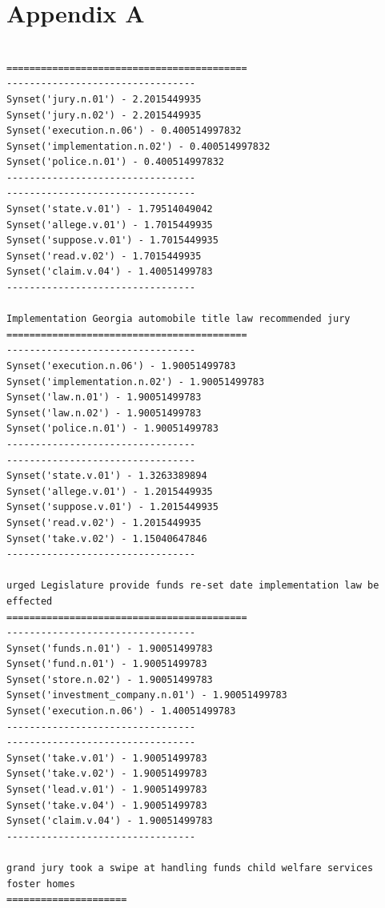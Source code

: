 \documentclass[]{article}
\begin{document}
\section*{Appendix A}
\label{sec:AppA}
\begin{lstlisting}[caption={A trace of the STM throughout runtime}, captionpos=b, label={lst:STMTrace}]

==========================================
---------------------------------
Synset('jury.n.01') - 2.2015449935
Synset('jury.n.02') - 2.2015449935
Synset('execution.n.06') - 0.400514997832
Synset('implementation.n.02') - 0.400514997832
Synset('police.n.01') - 0.400514997832
---------------------------------
---------------------------------
Synset('state.v.01') - 1.79514049042
Synset('allege.v.01') - 1.7015449935
Synset('suppose.v.01') - 1.7015449935
Synset('read.v.02') - 1.7015449935
Synset('claim.v.04') - 1.40051499783
---------------------------------

Implementation Georgia automobile title law recommended jury 
==========================================
---------------------------------
Synset('execution.n.06') - 1.90051499783
Synset('implementation.n.02') - 1.90051499783
Synset('law.n.01') - 1.90051499783
Synset('law.n.02') - 1.90051499783
Synset('police.n.01') - 1.90051499783
---------------------------------
---------------------------------
Synset('state.v.01') - 1.3263389894
Synset('allege.v.01') - 1.2015449935
Synset('suppose.v.01') - 1.2015449935
Synset('read.v.02') - 1.2015449935
Synset('take.v.02') - 1.15040647846
---------------------------------

urged Legislature provide funds re-set date implementation law be effected 
==========================================
---------------------------------
Synset('funds.n.01') - 1.90051499783
Synset('fund.n.01') - 1.90051499783
Synset('store.n.02') - 1.90051499783
Synset('investment_company.n.01') - 1.90051499783
Synset('execution.n.06') - 1.40051499783
---------------------------------
---------------------------------
Synset('take.v.01') - 1.90051499783
Synset('take.v.02') - 1.90051499783
Synset('lead.v.01') - 1.90051499783
Synset('take.v.04') - 1.90051499783
Synset('claim.v.04') - 1.90051499783
---------------------------------

grand jury took a swipe at handling funds child welfare services foster homes 
=====================

\end{lstlisting}
\end{document}
